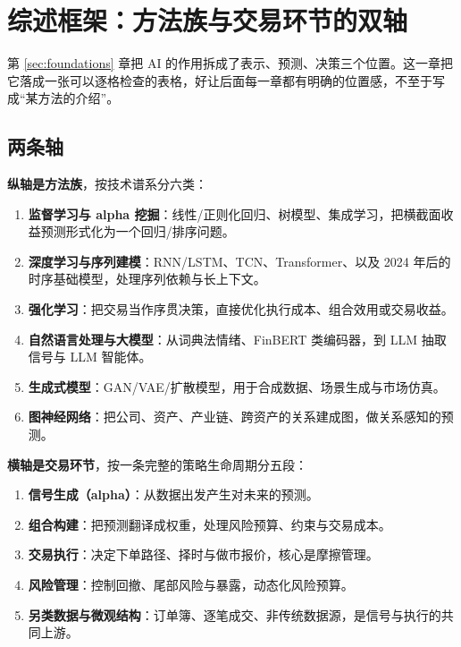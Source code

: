 \section{综述框架：方法族与交易环节的双轴}\label{sec:framework}

第 \ref{sec:foundations} 章把 AI 的作用拆成了表示、预测、决策三个位置。这一章把它落成一张可以逐格检查的表格，好让后面每一章都有明确的位置感，不至于写成“某方法的介绍”。

\subsection{两条轴}

\textbf{纵轴是方法族}，按技术谱系分六类：

\begin{enumerate}
  \item \textbf{监督学习与 alpha 挖掘}：线性/正则化回归、树模型、集成学习，把横截面收益预测形式化为一个回归/排序问题。
  \item \textbf{深度学习与序列建模}：RNN/LSTM、TCN、Transformer、以及 2024 年后的时序基础模型，处理序列依赖与长上下文。
  \item \textbf{强化学习}：把交易当作序贯决策，直接优化执行成本、组合效用或交易收益。
  \item \textbf{自然语言处理与大模型}：从词典法情绪、FinBERT 类编码器，到 LLM 抽取信号与 LLM 智能体。
  \item \textbf{生成式模型}：GAN/VAE/扩散模型，用于合成数据、场景生成与市场仿真。
  \item \textbf{图神经网络}：把公司、资产、产业链、跨资产的关系建成图，做关系感知的预测。
\end{enumerate}

\textbf{横轴是交易环节}，按一条完整的策略生命周期分五段：

\begin{enumerate}
  \item \textbf{信号生成（alpha）}：从数据出发产生对未来的预测。
  \item \textbf{组合构建}：把预测翻译成权重，处理风险预算、约束与交易成本。
  \item \textbf{交易执行}：决定下单路径、择时与做市报价，核心是摩擦管理。
  \item \textbf{风险管理}：控制回撤、尾部风险与暴露，动态化风险预算。
  \item \textbf{另类数据与微观结构}：订单簿、逐笔成交、非传统数据源，是信号与执行的共同上游。
\end{enumerate}

